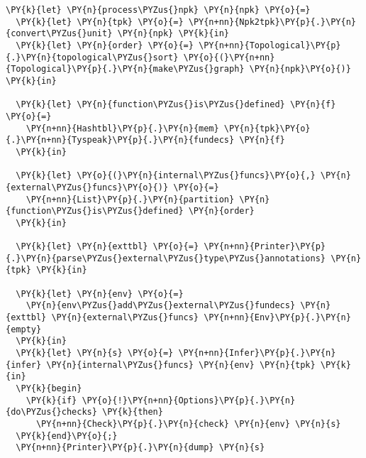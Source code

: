 \begin{Verbatim}[commandchars=\\\{\}]
\PY{k}{let} \PY{n}{process\PYZus{}npk} \PY{n}{npk} \PY{o}{=}
  \PY{k}{let} \PY{n}{tpk} \PY{o}{=} \PY{n+nn}{Npk2tpk}\PY{p}{.}\PY{n}{convert\PYZus{}unit} \PY{n}{npk} \PY{k}{in}
  \PY{k}{let} \PY{n}{order} \PY{o}{=} \PY{n+nn}{Topological}\PY{p}{.}\PY{n}{topological\PYZus{}sort} \PY{o}{(}\PY{n+nn}{Topological}\PY{p}{.}\PY{n}{make\PYZus{}graph} \PY{n}{npk}\PY{o}{)} \PY{k}{in}

  \PY{k}{let} \PY{n}{function\PYZus{}is\PYZus{}defined} \PY{n}{f} \PY{o}{=}
    \PY{n+nn}{Hashtbl}\PY{p}{.}\PY{n}{mem} \PY{n}{tpk}\PY{o}{.}\PY{n+nn}{Tyspeak}\PY{p}{.}\PY{n}{fundecs} \PY{n}{f}
  \PY{k}{in}

  \PY{k}{let} \PY{o}{(}\PY{n}{internal\PYZus{}funcs}\PY{o}{,} \PY{n}{external\PYZus{}funcs}\PY{o}{)} \PY{o}{=}
    \PY{n+nn}{List}\PY{p}{.}\PY{n}{partition} \PY{n}{function\PYZus{}is\PYZus{}defined} \PY{n}{order}
  \PY{k}{in}

  \PY{k}{let} \PY{n}{exttbl} \PY{o}{=} \PY{n+nn}{Printer}\PY{p}{.}\PY{n}{parse\PYZus{}external\PYZus{}type\PYZus{}annotations} \PY{n}{tpk} \PY{k}{in}

  \PY{k}{let} \PY{n}{env} \PY{o}{=}
    \PY{n}{env\PYZus{}add\PYZus{}external\PYZus{}fundecs} \PY{n}{exttbl} \PY{n}{external\PYZus{}funcs} \PY{n+nn}{Env}\PY{p}{.}\PY{n}{empty}
  \PY{k}{in}
  \PY{k}{let} \PY{n}{s} \PY{o}{=} \PY{n+nn}{Infer}\PY{p}{.}\PY{n}{infer} \PY{n}{internal\PYZus{}funcs} \PY{n}{env} \PY{n}{tpk} \PY{k}{in}
  \PY{k}{begin}
    \PY{k}{if} \PY{o}{!}\PY{n+nn}{Options}\PY{p}{.}\PY{n}{do\PYZus{}checks} \PY{k}{then}
      \PY{n+nn}{Check}\PY{p}{.}\PY{n}{check} \PY{n}{env} \PY{n}{s}
  \PY{k}{end}\PY{o}{;}
  \PY{n+nn}{Printer}\PY{p}{.}\PY{n}{dump} \PY{n}{s}
\end{Verbatim}
